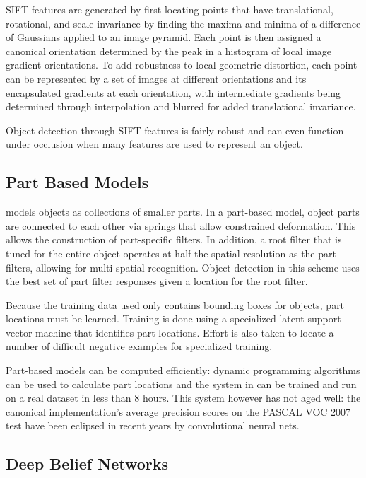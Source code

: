 \documentclass[10pt,twocolumn,letterpaper]{article}
\begin{document}
SIFT features are generated by first locating points that have translational, rotational,
and scale invariance by finding the maxima and minima of a difference of Gaussians
applied to an image pyramid. Each point is then assigned a canonical orientation
determined by the peak in a histogram of local image gradient orientations. To add
robustness to local geometric distortion, each point can be represented by a set of
images at different orientations and its encapsulated gradients at each orientation,
with intermediate gradients being determined through interpolation and blurred for
added translational invariance.

Object detection through SIFT features is fairly robust and can even function under
occlusion when many features are used to represent an object.

\subsection{Part Based Models}

\cite{PartModels} models objects as collections of smaller parts.
In a part-based model, object parts are connected to each other via springs that
allow constrained deformation. This allows the construction of part-specific filters.
In addition, a root filter that is tuned for the entire object operates at half
the spatial resolution as the part filters, allowing for multi-spatial recognition.
Object detection in this scheme uses the best set of part filter responses given a
location for the root filter.

Because the training data used only contains bounding boxes for objects,
part locations must be learned. Training is done using a specialized latent support
vector machine that identifies part locations. Effort is also taken to locate a
number of difficult negative examples for specialized training.

Part-based models can be computed efficiently: dynamic programming algorithms
can be used to calculate part locations and the system in \cite{PartModels} can be trained
and run on a real dataset in less than 8 hours.
This system however has not aged well: the canonical implementation's average precision
scores on the PASCAL VOC 2007 \cite{PascalVOC} test have been eclipsed in recent years
by convolutional neural nets.

\subsection{Deep Belief Networks}
\end{document}
